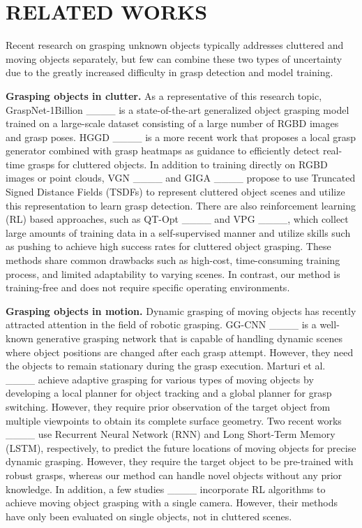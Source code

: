 \section{RELATED WORKS}
Recent research on grasping unknown objects typically addresses cluttered and moving objects separately, but few can combine these two types of uncertainty due to the greatly increased difficulty in grasp detection and model training.

\textbf{Grasping objects in clutter.} As a representative of this research topic, GraspNet-1Billion ____ is a state-of-the-art generalized object grasping model trained on a large-scale dataset consisting of a large number of RGBD images and grasp poses. HGGD ____ is a more recent work that proposes a local grasp generator combined with grasp heatmaps as guidance to efficiently detect real-time grasps for cluttered objects. In addition to training directly on RGBD images or point clouds, VGN ____ and GIGA ____ propose to use Truncated Signed Distance Fields (TSDFs) to represent cluttered object scenes and utilize this representation to learn grasp detection. There are also reinforcement learning (RL) based approaches, such as QT-Opt ____ and VPG ____, which collect large amounts of training data in a self-supervised manner and utilize skills such as pushing to achieve high success rates for cluttered object grasping. These methods share common drawbacks such as high-cost, time-consuming training process, and limited adaptability to varying scenes. In contrast, our method is training-free and does not require specific operating environments.

\textbf{Grasping objects in motion.} Dynamic grasping of moving objects has recently attracted attention in the field of robotic grasping. GG-CNN ____ is a well-known generative grasping network that is capable of handling dynamic scenes where object positions are changed after each grasp attempt. However, they need the objects to remain stationary during the grasp execution. Marturi et al. ____ achieve adaptive grasping for various types of moving objects by developing a local planner for object tracking and a global planner for grasp switching. However, they require prior observation of the target object from multiple viewpoints to obtain its complete surface geometry. Two recent works ____ use Recurrent Neural Network (RNN) and Long Short-Term Memory (LSTM), respectively, to predict the future locations of moving objects for precise dynamic grasping. However, they require the target object to be pre-trained with robust grasps, whereas our method can handle novel objects without any prior knowledge. In addition, a few studies ____ incorporate RL algorithms to achieve moving object grasping with a single camera. However, their methods have only been evaluated on single objects, not in cluttered scenes.